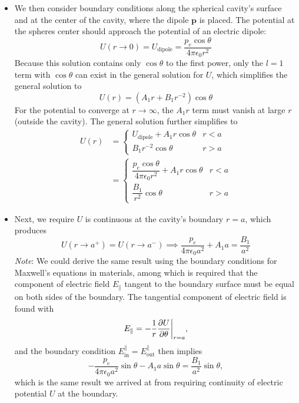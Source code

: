 \documentclass[11pt, a4paper]{article}
\renewcommand{\vec}[1]{\bm{#1}} %
\newcommand{\ee}{\epsilon_{0}}  %
\newcommand{\pe}{\vec{p}}  %
\begin{document}
\begin{itemize}
	\item We then consider boundary conditions along the spherical cavity's surface and at the center of the cavity, where the dipole $ \pe $ is placed. The potential at the spheres center should approach the potential of an electric dipole:
	\begin{equation*}
		U(r \to 0) = U_{\mathrm{dipole}} = \frac{p_{e}\cos \theta}{4 \pi \ee r^{2}}
	\end{equation*}
	Because this solution contains only $ \cos \theta $ to the first power, only the $ l = 1 $ term with $ \cos \theta $ can exist in the general solution for $ U $, which simplifies the general solution to
	\begin{equation*}
		U(r) = (A_{1}r + B_{1}r^{-2})\cos \theta
	\end{equation*}
	For the potential to converge at $  r \to \infty $, the $ A_{1}r $ term must vanish at large $ r $ (outside the cavity). The general solution further simplifies to
	\begin{align*}
		U(r) &= 
		\begin{cases}
			U_{\text{dipole}} + A_{1}r \cos \theta & r < a\\
			B_{1}r^{-2} \cos \theta & r > a
		\end{cases}\\
		& = 
		\begin{cases}
			\dfrac{p_{e}\cos \theta}{4 \pi \ee r^{2}} + A_{1}r \cos \theta & r < a\\[2mm]
			\dfrac{B_{1}}{r^{2}}\cos \theta & r > a
		\end{cases}
	\end{align*}
	
	\item Next, we require $ U $ is continuous at the cavity's boundary $ r = a $, which produces
	\begin{equation*}
		U(r \to a^{+}) = U(r \to a^{-}) \implies \frac{p_{e}}{4\pi \ee a^{2}} + A_{1}a = \frac{B_{1}}{a^{2}}
	\end{equation*}
	\textit{Note}: We could derive the same result using the boundary conditions for Maxwell's equations in materials, among which is required that the component of electric field $ E_{\parallel} $ tangent to the boundary surface must be equal on both sides of the boundary. The tangential component of electric field is found with
	\begin{equation*}
		E_{\parallel} = -\frac{1}{r}\pdv{U}{\theta}\bigg |_{r=a},
	\end{equation*}
	and the boundary condition $ E_{\text{in}}^{\parallel} = E_{\text{out}}^{\parallel}  $ then implies 
	\begin{equation*}
		- \frac{p_{e}}{4\pi \ee a^{2}} \sin \theta - A_{1} a \sin \theta = \frac{B_{1}}{a^{2}} \sin \theta,
	\end{equation*}
	which is the same result we arrived at from requiring continuity of electric potential $ U $ at the boundary. 
	

\end{itemize}
\end{document}
